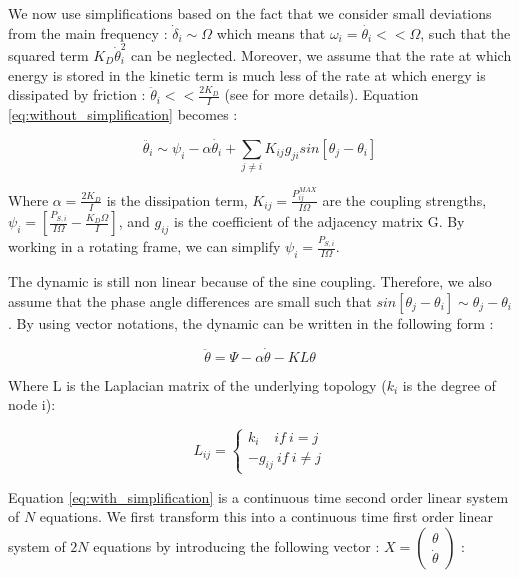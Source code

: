 \documentclass[conference]{IEEEtran}
\begin{document}
We now use simplifications based on the fact that we consider small deviations from the main frequency : $ \dot{ \delta}_i \sim \Omega $ which means that $ \omega_i = \dot{\theta_i} << \Omega $, such that the squared term $ K_D \dot{\theta}_i^2 $ can be neglected.
Moreover, we assume that the rate at which energy is stored in the kinetic term is much less of the rate at which energy is dissipated by friction : $ \ddot{ \theta }_i  << \frac{2 K_D}{I} $ (see \cite{Filatrella2008} for more details). Equation \ref{eq:without_simplification} becomes :

\begin{equation}
 \ddot{ \theta_i } \sim \psi_i - \alpha \dot{ \theta_i } + \sum_{j\neq i} K_{ij} g_{ji} sin \left[ \theta_j - \theta_i \right] 
\end{equation}

Where $ \alpha = \frac{2 K_D}{I} $ is the dissipation term, $ K_{ij} = \frac{P_{ij}^{MAX}}{I \Omega} $ are the coupling strengths, $ \psi_i = \left[ \frac{P_{S,i}}{I \Omega} - \frac{K_D \Omega}{I} \right] $, and $ g_{ij} $ is the coefficient of the adjacency matrix G.
By working in a rotating frame, we can simplify $ \psi_i=\frac{P_{S,i}}{I \Omega} $.

The dynamic is still non linear because of the sine coupling. Therefore, we also assume that the phase angle differences are small such that $ sin \left[ \theta_j - \theta_i \right] \sim \theta_j - \theta_i $. By using vector notations, the dynamic can be written in the following form :

\begin{equation}
\label{eq:with_simplification}
\ddot{\theta} = \Psi - \alpha \dot{\theta} - KL\theta
\end{equation}

Where L is the Laplacian matrix of the underlying topology ($ k_i $ is the degree of node i):

\begin{equation}
L_{ij} = \left\{ \begin{array}{lll} k_i\ \ \ \ \,if\ i=j \\ -g_{ij}\  if\ i \neq j \end{array} \right. 
\end{equation}


Equation \ref{eq:with_simplification} is a continuous time second order linear system of $ N $ equations. We first transform this into a continuous time first order linear system of $ 2 N $ equations by introducing the following vector : $ X = \left( \begin{array}{c} \theta \\ \dot{\theta} \end{array} \right)$ : 
\end{document}
